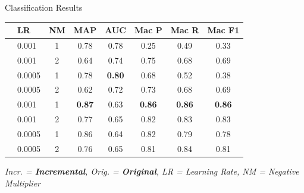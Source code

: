 \documentclass[aspectratio=169,xcolor=dvipsnames]{beamer}
\begin{document}
\begin{frame}{Classification Results }
	\begin{table}
		\centering
		\footnotesize
		\begin{tabular}{llcccccc}
			\toprule
			 & \textbf{LR} & \textbf{NM} & \textbf{MAP}  & \textbf{AUC}  & \textbf{Mac P} & \textbf{Mac R} & \textbf{Mac F1} \\
			\midrule
			\multirow{4}{*}{\rotatebox{90}{\textcolor{drawblue}{\textbf{Incr.}}}}
			 & 0.001       & 1           & 0.78          & 0.78          & 0.25           & 0.49           & 0.33            \\
			 & 0.001       & 2           & 0.64          & 0.74          & 0.75           & 0.68           & 0.69            \\
			 & 0.0005      & 1           & 0.78          & \textbf{0.80} & 0.68           & 0.52           & 0.38            \\
			 & 0.0005      & 2           & 0.62          & 0.72          & 0.73           & 0.68           & 0.69            \\
			\midrule
			\multirow{4}{*}{\rotatebox{90}{\textcolor{drawred}{\textbf{Orig.}}}}
			 & 0.001       & 1           & \textbf{0.87} & 0.63          & \textbf{0.86}  & \textbf{0.86}  & \textbf{0.86}   \\
			 & 0.001       & 2           & 0.77          & 0.65          & 0.82           & 0.83           & 0.83            \\
			 & 0.0005      & 1           & 0.86          & 0.64          & 0.82           & 0.79           & 0.78            \\
			 & 0.0005      & 2           & 0.76          & 0.65          & 0.81           & 0.84           & 0.81            \\
			\bottomrule
		\end{tabular}
	\end{table}

	\vspace{0.5em}
	\centering
	\textit{Incr. = \textcolor{drawblue}{\textbf{Incremental}}, Orig. = \textcolor{drawred}{\textbf{Original}}, LR = Learning Rate, NM = Negative Multiplier}
\end{frame}
\end{document}
